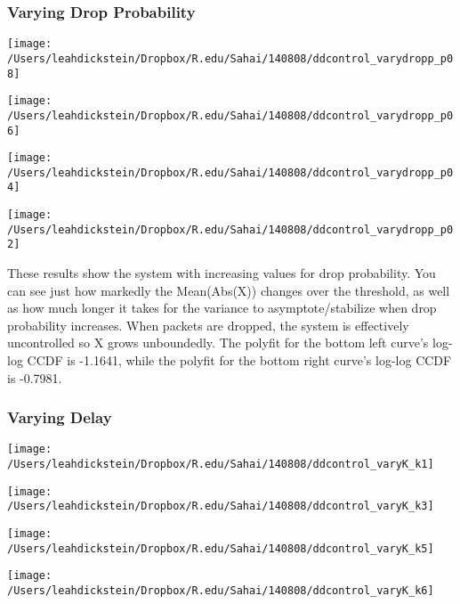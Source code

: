 \documentclass[leqno,twocolumn]{article}
\begin{document}
\subsubsection{Varying Drop Probability}

\begin{minipage}[c]{0.5\textwidth}
\texttt{[image: /Users/leahdickstein/Dropbox/R.edu/Sahai/140808/ddcontrol\_varydropp\_p08]}
\end{minipage}
\begin{minipage}[c]{0.5\textwidth}
\texttt{[image: /Users/leahdickstein/Dropbox/R.edu/Sahai/140808/ddcontrol\_varydropp\_p06]}
\end{minipage}

\begin{minipage}[c]{0.5\textwidth}
\texttt{[image: /Users/leahdickstein/Dropbox/R.edu/Sahai/140808/ddcontrol\_varydropp\_p04]}
\end{minipage}
\begin{minipage}[c]{0.5\textwidth}
\texttt{[image: /Users/leahdickstein/Dropbox/R.edu/Sahai/140808/ddcontrol\_varydropp\_p02]}
\end{minipage}

These results show the system with increasing values for drop probability. You can see just how markedly the Mean(Abs(X)) changes over the threshold, as well as how much longer it takes for the variance to asymptote/stabilize when drop probability increases. When packets are dropped, the system is effectively uncontrolled so X grows unboundedly. The polyfit for the bottom left curve's log-log CCDF is -1.1641, while the polyfit for the bottom right curve's log-log CCDF is -0.7981.

\subsubsection{Varying Delay}

\begin{minipage}[c]{0.5\textwidth}
\texttt{[image: /Users/leahdickstein/Dropbox/R.edu/Sahai/140808/ddcontrol\_varyK\_k1]}
\end{minipage}
\begin{minipage}[c]{0.5\textwidth}
\texttt{[image: /Users/leahdickstein/Dropbox/R.edu/Sahai/140808/ddcontrol\_varyK\_k3]}
\end{minipage}

\begin{minipage}[c]{0.5\textwidth}
\texttt{[image: /Users/leahdickstein/Dropbox/R.edu/Sahai/140808/ddcontrol\_varyK\_k5]}
\end{minipage}
\begin{minipage}[c]{0.5\textwidth}
\texttt{[image: /Users/leahdickstein/Dropbox/R.edu/Sahai/140808/ddcontrol\_varyK\_k6]}
\end{minipage}
\end{document}
